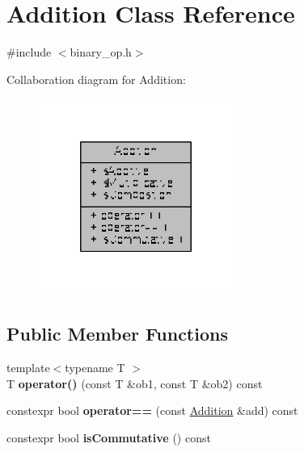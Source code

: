 \hypertarget{classAddition}{\section{Addition Class Reference}
\label{classAddition}
}


{\ttfamily \#include $<$binary\-\_\-op.\-h$>$}



Collaboration diagram for Addition\-:
\nopagebreak
\begin{figure}[H]
\begin{center}
\leavevmode
\includegraphics[width=180pt]{classAddition__coll__graph}
\end{center}
\end{figure}
\subsection*{Public Member Functions}
\begin{DoxyCompactItemize}
\item 
\hypertarget{classAddition_a0cd0e60cd506c9e640d89422303d77b7}{{\footnotesize template$<$typename T $>$ }\\T {\bfseries operator()} (const T \&ob1, const T \&ob2) const }\label{classAddition_a0cd0e60cd506c9e640d89422303d77b7}

\item 
\hypertarget{classAddition_a3369cb1552dd8249b829cdd03e1ffa9d}{constexpr bool {\bfseries operator==} (const \hyperlink{classAddition}{Addition} \&add) const }\label{classAddition_a3369cb1552dd8249b829cdd03e1ffa9d}

\item 
\hypertarget{classAddition_ad481681c51f27fd0f65ad9f1d8d04469}{constexpr bool {\bfseries is\-Commutative} () const }\label{classAddition_ad481681c51f27fd0f65ad9f1d8d04469}

\end{DoxyCompactItemize}
